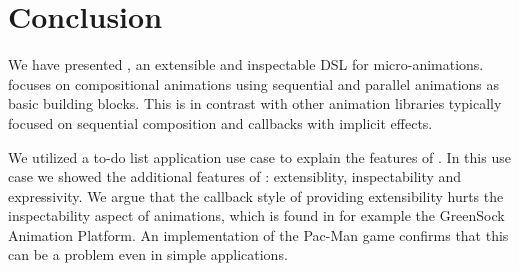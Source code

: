 \section{Conclusion}
\label{sec:conclusion}

We have presented \dsl{}, an extensible and inspectable DSL for micro-animations. \dsl{} focuses on compositional animations using sequential and parallel animations as basic building blocks. This is in contrast with other animation libraries typically focused on sequential composition and callbacks with implicit effects.

We utilized a to-do list application use case to explain the features of \dsl{}. In this use case we showed the additional features of \dsl{}: extensiblity, inspectability and expressivity. We argue that the callback style of providing extensibility hurts the inspectability aspect of animations, which is found in for example the GreenSock Animation Platform. An implementation of the Pac-Man game confirms that this can be a problem even in simple applications.
